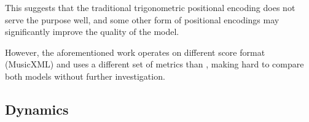 This suggests that the traditional trigonometric positional encoding does not serve the purpose well, and some other form of positional encodings may significantly improve the quality of the model.

However, the aforementioned work operates on different score format (MusicXML) and uses a different set of metrics than \cite{Liu2022}, making hard to compare both models without further investigation.

\subsection{Dynamics}


